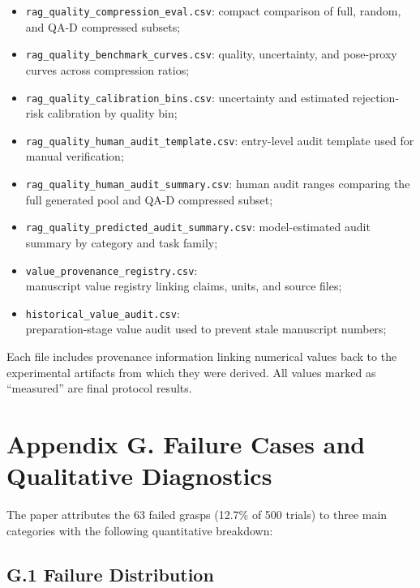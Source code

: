 \documentclass[11pt]{article}
\begin{document}
\begin{itemize}[leftmargin=1.5em]
\item \texttt{rag\_quality\_compression\_eval.csv}: compact comparison of full, random, and QA-D compressed subsets;
\item \texttt{rag\_quality\_benchmark\_curves.csv}: quality, uncertainty, and pose-proxy curves across compression ratios;
\item \texttt{rag\_quality\_calibration\_bins.csv}: uncertainty and estimated rejection-risk calibration by quality bin;
\item \texttt{rag\_quality\_human\_audit\_template.csv}: entry-level audit template used for manual verification;
\item \texttt{rag\_quality\_human\_audit\_summary.csv}: human audit ranges comparing the full generated pool and QA-D compressed subset;
\item \texttt{rag\_quality\_predicted\_audit\_summary.csv}: model-estimated audit summary by category and task family;
\item \texttt{value\_provenance\_registry.csv}:\\ manuscript value registry linking claims, units, and source files;
\item \texttt{historical\_value\_audit.csv}:\\ preparation-stage value audit used to prevent stale manuscript numbers;
\end{itemize}

Each file includes provenance information linking numerical values back to the experimental artifacts from which they were derived. All values marked as ``measured'' are final protocol results.

\section{Appendix G. Failure Cases and Qualitative Diagnostics}

The paper attributes the 63 failed grasps (12.7\% of 500 trials) to three main categories with the following quantitative breakdown:

\subsection{G.1 Failure Distribution}
\end{document}

